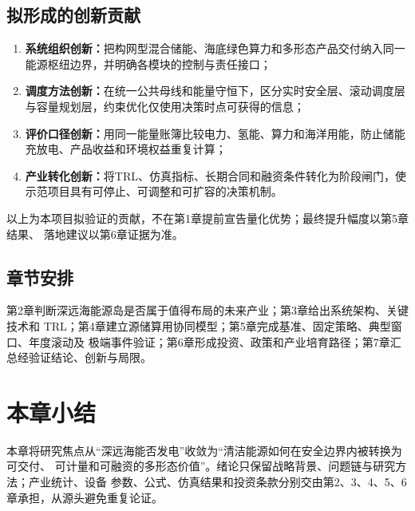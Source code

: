 \subsection{拟形成的创新贡献}

\begin{enumerate}
  \item \textbf{系统组织创新：}把构网型混合储能、海底绿色算力和多形态产品交付纳入同一能源枢纽边界，并明确各模块的控制与责任接口；
  \item \textbf{调度方法创新：}在统一公共母线和能量守恒下，区分实时安全层、滚动调度层与容量规划层，约束优化仅使用决策时点可获得的信息；
  \item \textbf{评价口径创新：}用同一能量账簿比较电力、氢能、算力和海洋用能，防止储能充放电、产品收益和环境权益重复计算；
  \item \textbf{产业转化创新：}将TRL、仿真指标、长期合同和融资条件转化为阶段闸门，使示范项目具有可停止、可调整和可扩容的决策机制。
\end{enumerate}

以上为本项目拟验证的贡献，不在第1章提前宣告量化优势；最终提升幅度以第5章结果、
落地建议以第6章证据为准。

\subsection{章节安排}

第2章判断深远海能源岛是否属于值得布局的未来产业；第3章给出系统架构、关键技术和
TRL；第4章建立源储算用协同模型；第5章完成基准、固定策略、典型窗口、年度滚动及
极端事件验证；第6章形成投资、政策和产业培育路径；第7章汇总经验证结论、创新与局限。

\section*{本章小结}

本章将研究焦点从“深远海能否发电”收敛为“清洁能源如何在安全边界内被转换为可交付、
可计量和可融资的多形态价值”。绪论只保留战略背景、问题链与研究方法；产业统计、设备
参数、公式、仿真结果和投资条款分别交由第2、3、4、5、6章承担，从源头避免重复论证。
